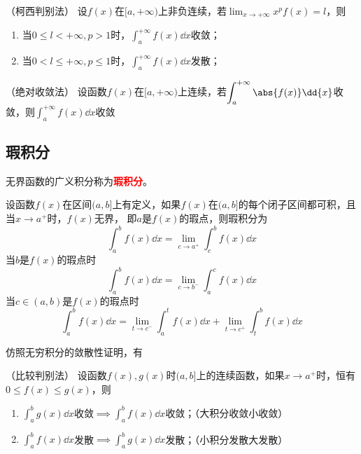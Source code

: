 \begin{theorem}
    （柯西判别法）
    \label{th:无穷积分柯西判别法}
    设$f(x)$在$[a,+\infty)$上非负连续，若$\displaystyle\lim_{x\to+\infty}x^pf(x)=l$，则
    \begin{enumerate}[(1)]
        \item 当$0\leq l < +\infty,p>1$时，$\displaystyle\int_a^{+\infty}f(x)\dd{x}$收敛；
        \item 当$0< l \leq +\infty,p\leq 1$时，$\displaystyle\int_a^{+\infty}f(x)\dd{x}$发散；
    \end{enumerate}
\end{theorem}

\begin{theorem}
    （绝对收敛法）
    \label{th:无穷积分绝对收敛法}
    设函数$f(x)$在$[a,+\infty)$上连续，若$\displaystyle\int_a^{+\infty}\abs{f(x)}\dd{x}$收敛，则$\displaystyle\int_a^{+\infty}f(x)\dd{x}$收敛
\end{theorem}

\subsection{瑕积分}
无界函数的广义积分称为\textcolor{red}{\textsf{\textbf{瑕积分}}}。
\begin{definition}
    设函数$f(x)$在区间$(a,b]$上有定义，如果$f(x)$在$(a,b]$的每个闭子区间都可积，且当$x\to a^+$时，$f(x)$无界，
    即$a$是$f(x)$的瑕点，则瑕积分为
    \[ \int_a^bf(x)\dd{x} = \lim_{c\to a^+}\int_c^bf(x)\dd{x} \]
    当$b$是$f(x)$的瑕点时
    \[ \int_a^b f(x)\dd{x} = \lim_{c\to b^-}\int_a^cf(x)\dd{x} \]
    当$c\in(a,b)$是$f(x)$的瑕点时
    \[ \int_a^b f(x)\dd{x} = \lim_{t\to c^-}\int_a^tf(x)\dd{x} + \lim_{t\to c^+}\int_t^bf(x)\dd{x} \]
\end{definition}

仿照无穷积分的敛散性证明，有
\begin{theorem}
    （比较判别法）
    \label{th:瑕积分比较判别法}
    设函数$f(x),g(x)$时$(a,b]$上的连续函数，如果$x\to a^+$时，恒有$0\leq f(x) \leq g(x)$，则
    \begin{enumerate}[(1)]
        \item $\displaystyle\int_a^b g(x)\dd{x}$收敛$\displaystyle\implies\int_a^bf(x)\dd{x}$收敛；（大积分收敛小收敛）
        \item $\displaystyle\int_a^b f(x)\dd{x}$发散$\displaystyle\implies\int_a^bg(x)\dd{x}$发散；（小积分发散大发散）
    \end{enumerate}
\end{theorem}

